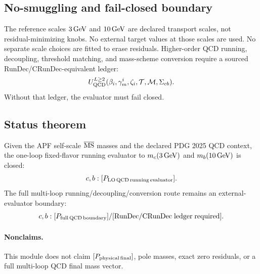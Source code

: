 \subsection{No-smuggling and fail-closed boundary}
The reference scales \(3\,\rm GeV\) and \(10\,\rm GeV\) are declared transport scales, not residual-minimizing knobs. No external target values at those scales are used. No separate scale choices are fitted to erase residuals. Higher-order QCD running, decoupling, threshold matching, and mass-scheme conversion require a sourced RunDec/CRunDec-equivalent ledger:
\[
 U_{\rm QCD}^{L\ge2}(\beta_i,\gamma_m^i,\zeta_i,\mathcal T,\mathcal M,\Sigma_{cb}).
\]
Without that ledger, the evaluator must fail closed.

\subsection{Status theorem}
\begin{theorem}
Given the APF self-scale \(\overline{\rm MS}\) masses and the declared PDG 2025 QCD context, the one-loop fixed-flavor running evaluator to \(m_c(3\,\rm GeV)\) and \(m_b(10\,\rm GeV)\) is closed:
\[
 c,b:[P_{\rm LO\,QCD\,running\,evaluator}].
\]
The full multi-loop running/decoupling/conversion route remains an external-evaluator boundary:
\[
 c,b:[P_{\rm full\,QCD\,boundary}]/[{\rm RunDec/CRunDec\;ledger\;required}].
\]
\end{theorem}

\paragraph{Nonclaims.}
This module does not claim \([P_{\rm physical\,final}]\), pole masses, exact zero residuals, or a full multi-loop QCD final mass vector.
